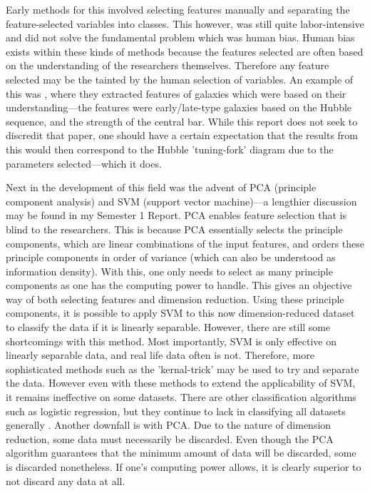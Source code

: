 \documentclass[a4paper,fleqn,usenatbib]{mnras}
\begin{document}
Early methods for this involved selecting features manually and separating the feature-selected variables into classes. This however, was still quite labor-intensive and did not solve the fundamental problem which was human bias. Human bias exists within these kinds of methods because the features selected are often based on the understanding of the researchers themselves. Therefore any feature selected may be the tainted by the human selection of variables. An example of this was \cite{Abraham2000}, where they extracted features of galaxies which were based on their understanding---the features were early/late-type galaxies based on the Hubble sequence, and the strength of the central bar. While this report does not seek to discredit that paper, one should have a certain expectation that the results from this would then correspond to the Hubble 'tuning-fork' diagram due to the parameters selected---which it does. 

Next in the development of this field was the advent of PCA (principle component analysis) and SVM (support vector machine)---a lengthier discussion may be found in my Semester 1 Report. PCA enables feature selection that is blind to the researchers. This is because PCA essentially selects the principle components, which are linear combinations of the input features, and orders these principle components in order of variance (which can also be understood as information density). With this, one only needs to select as many principle components as one has the computing power to handle. This gives an objective way of both selecting features and dimension reduction. Using these principle components, it is possible to apply SVM to this now dimension-reduced dataset to classify the data if it is linearly separable. \cite{SVM} However, there are still some shortcomings with this method. Most importantly, SVM is only effective on linearly separable data, and real life data often is not. Therefore, more sophisticated methods such as the 'kernal-trick' \cite{kernaltrick} may be used to try and separate the data. However even with these methods to extend the applicability of SVM, it remains ineffective on some datasets. There are other classification algorithms such as logistic regression, but they continue to lack in classifying all datasets generally \cite{UniversalApproximationTheorem}. Another downfall is with PCA. Due to the nature of dimension reduction, some data must necessarily be discarded. Even though the PCA algorithm guarantees that the minimum amount of data will be discarded, some is discarded nonetheless. If one's computing power allows, it is clearly superior to not discard any data at all. 
\end{document}
